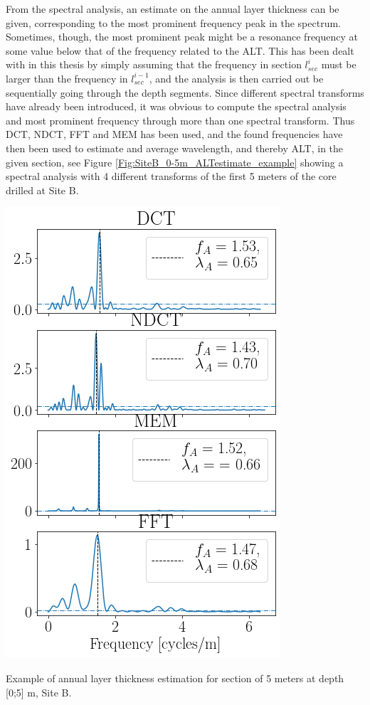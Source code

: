 \documentclass[../../CompleteThesis2/Complete_2ndDraft]{subfiles}
\begin{document}
From the spectral analysis, an estimate on the annual layer thickness can be given, corresponding to the most prominent frequency peak in the spectrum. Sometimes, though, the most prominent peak might be a resonance frequency at some value below that of the frequency related to the ALT. This has been dealt with in this thesis by simply assuming that the frequency in section $l_{sec}^i$ must be larger than the frequency in $l_{sec}^{i-1}$, and the analysis is then carried out be sequentially going through the depth segments. Since different spectral transforms have already been introduced, it was obvious to compute the spectral analysis and most prominent frequency through more than one spectral transform. Thus DCT, NDCT, FFT and MEM has been used, and the found frequencies have then been used to estimate and average wavelength, and thereby ALT, in the given section, see Figure \ref{Fig:SiteB_0-5m_ALTestimate_example} showing a spectral analysis with 4 different transforms of the first 5 meters of the core drilled at Site B.

\begin{marginfigure}
	\centering
	\includegraphics[width=\marginparwidth]{ALTestimate_example.png}
	\caption[$\lambda$ estimation example, Site B, in frequency domain.]{\footnotesize Example of annual layer thickness estimation for section of 5 meters at depth [0;5] m, Site B.}
	\label{Fig:SiteB_0-5m_ALTestimate_example}
\end{marginfigure}
\end{document}
